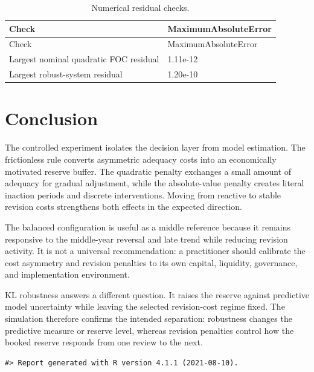 \documentclass[
  10pt,
]{article}
\begin{document}
\begin{longtable}[]{@{}ll@{}}
\caption{Numerical residual checks.}\tabularnewline
\toprule
Check & MaximumAbsoluteError \\
\midrule
\endfirsthead
\toprule
Check & MaximumAbsoluteError \\
\midrule
\endhead
Largest nominal quadratic FOC residual & 1.11e-12 \\
Largest robust-system residual & 1.20e-10 \\
\bottomrule
\end{longtable}

\hypertarget{conclusion}{%
\section{Conclusion}\label{conclusion}}

The controlled experiment isolates the decision layer from model
estimation. The frictionless rule converts asymmetric adequacy costs
into an economically motivated reserve buffer. The quadratic penalty
exchanges a small amount of adequacy for gradual adjustment, while the
absolute-value penalty creates literal inaction periods and discrete
interventions. Moving from reactive to stable revision costs strengthens
both effects in the expected direction.

The balanced configuration is useful as a middle reference because it
remains responsive to the middle-year reversal and late trend while
reducing revision activity. It is not a universal recommendation: a
practitioner should calibrate the cost asymmetry and revision penalties
to its own capital, liquidity, governance, and implementation
environment.

KL robustness answers a different question. It raises the reserve
against predictive model uncertainty while leaving the selected
revision-cost regime fixed. The simulation therefore confirms the
intended separation: robustness changes the predictive measure or
reserve level, whereas revision penalties control how the booked reserve
responds from one review to the next.

\begin{verbatim}
#> Report generated with R version 4.1.1 (2021-08-10).
\end{verbatim}
\end{document}
